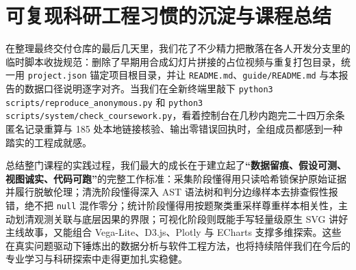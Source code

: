 \section{可复现科研工程习惯的沉淀与课程总结}

在整理最终交付仓库的最后几天里，我们花了不少精力把散落在各人开发分支里的临时脚本收拢规范：删除了早期用合成幻灯片拼接的占位视频与重复打包目录，统一用 \texttt{project.json} 锚定项目根目录，并让 \texttt{README.md}、\texttt{guide/README.md} 与本报告的数据口径说明逐字对齐。当我们在全新终端里敲下 \texttt{python3 scripts/reproduce\_anonymous.py} 和 \texttt{python3 scripts/system/check\_coursework.py}，看着控制台在几秒内跑完二十四万余条匿名记录重算与 185 处本地链接核验、输出零错误回执时，全组成员都感到一种踏实的工程成就感。

总结整门课程的实践过程，我们最大的成长在于建立起了\textbf{“数据留痕、假设可测、视图诚实、代码可跑”}的完整工作标准：采集阶段懂得用只读哈希锁保护原始证据并履行脱敏伦理；清洗阶段懂得深入 AST 语法树和判分边缘样本去排查假性报错，绝不把 \texttt{null} 混作零分；统计阶段懂得用按题聚类重采样尊重样本相关性，主动划清观测关联与底层因果的界限；可视化阶段则既能手写轻量级原生 SVG 讲好主线故事，又能组合 Vega-Lite、D3.js、Plotly 与 ECharts 支撑多维探索。这些在真实问题驱动下锤炼出的数据分析与软件工程方法，也将持续陪伴我们在今后的专业学习与科研探索中走得更加扎实稳健。
